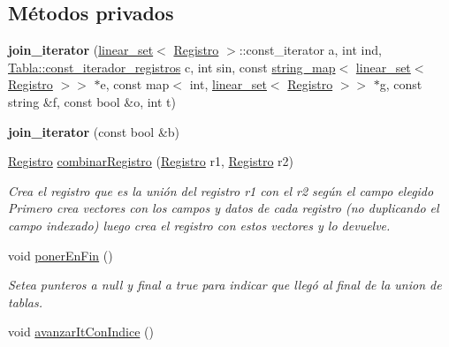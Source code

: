 \subsection*{Métodos privados}
\begin{DoxyCompactItemize}
\item 
\mbox{\label{classBaseDeDatos_1_1join__iterator_a48e71e18ba7a2e758d1d668fa3c5b092}} 
{\bfseries join\+\_\+iterator} (\mbox{\hyperlink{classlinear__set}{linear\+\_\+set}}$<$ \mbox{\hyperlink{classRegistro}{Registro}} $>$\+::const\+\_\+iterator a, int ind, \mbox{\hyperlink{classTabla_1_1const__iterador__registros}{Tabla\+::const\+\_\+iterador\+\_\+registros}} c, int sin, const \mbox{\hyperlink{classstring__map}{string\+\_\+map}}$<$ \mbox{\hyperlink{classlinear__set}{linear\+\_\+set}}$<$ \mbox{\hyperlink{classRegistro}{Registro}} $>$$>$ $\ast$e, const map$<$ int, \mbox{\hyperlink{classlinear__set}{linear\+\_\+set}}$<$ \mbox{\hyperlink{classRegistro}{Registro}} $>$$>$ $\ast$g, const string \&f, const bool \&o, int t)
\item 
\mbox{\label{classBaseDeDatos_1_1join__iterator_a5c2c5e0ac0dd48eda6a865893825f6e2}} 
{\bfseries join\+\_\+iterator} (const bool \&b)
\item 
\mbox{\hyperlink{classRegistro}{Registro}} \mbox{\hyperlink{classBaseDeDatos_1_1join__iterator_ab18c679b90081c47622e879ef8e5377c}{combinar\+Registro}} (\mbox{\hyperlink{classRegistro}{Registro}} r1, \mbox{\hyperlink{classRegistro}{Registro}} r2)
\begin{DoxyCompactList}\small\item\em Crea el registro que es la unión del registro r1 con el r2 según el campo elegido Primero crea vectores con los campos y datos de cada registro (no duplicando el campo indexado) luego crea el registro con estos vectores y lo devuelve. \end{DoxyCompactList}\item 
void \mbox{\hyperlink{classBaseDeDatos_1_1join__iterator_a2f86621f116760476b8c1704af4b184f}{poner\+En\+Fin}} ()
\begin{DoxyCompactList}\small\item\em Setea punteros a null y final a true para indicar que llegó al final de la union de tablas. \end{DoxyCompactList}\item 
void \mbox{\hyperlink{classBaseDeDatos_1_1join__iterator_a6b92163c76654697c82f11d634b885a7}{avanzar\+It\+Con\+Indice}} ()

\end{DoxyCompactItemize}
